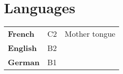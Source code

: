 \documentclass[lighthipster]{simplehipstercv}
\begin{document}
\begin{paracol}{2}
\begin{tabular}{r| p{} c}
\end{tabular}
\vspace{3em}

\begin{minipage}[t]{0.3\textwidth}
\bigskip

\section*{Languages}
\begin{tabular}{l | ll}
\textbf{French} & C2 & {\phantom{x}\footnotesize Mother tongue} \\
\textbf{English} & B2 \\
\textbf{German} & B1 \\

\end{tabular}
\bigskip

\end{minipage}\hfill
\begin{minipage}[t]{0.3\textwidth}

\bigskip


\end{minipage}






\vfill{} %

\setlength{\parindent}{0pt}

\end{paracol}
\end{document}
